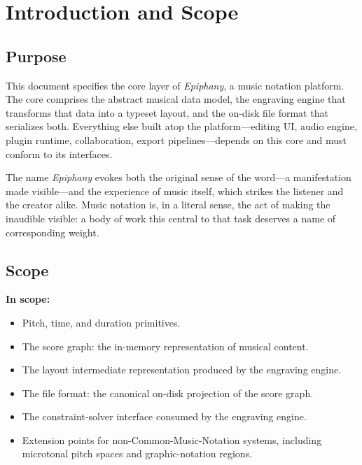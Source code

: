 \documentclass[11pt,letterpaper]{report}
\begin{document}
\clearpage
{}

\chapter{Introduction and Scope}
\label{ch:intro}

\section{Purpose}

This document specifies the core layer of \textit{Epiphany}, a music
notation platform. The core comprises the abstract musical data
model, the engraving engine that transforms that data into a typeset
layout, and the on-disk file format that serializes both. Everything
else built atop the platform---editing UI, audio engine, plugin
runtime, collaboration, export pipelines---depends on this core and
must conform to its interfaces.

The name \textit{Epiphany} evokes both the original sense of the
word---a manifestation made visible---and the experience of music
itself, which strikes the listener and the creator alike. Music
notation is, in a literal sense, the act of making the inaudible
visible: a body of work this central to that task deserves a name
of corresponding weight.

\section{Scope}

\textbf{In scope:}

\begin{itemize}
  \item Pitch, time, and duration primitives.
  \item The score graph: the in-memory representation of musical content.
  \item The layout intermediate representation produced by the engraving
    engine.
  \item The file format: the canonical on-disk projection of the score
    graph.
  \item The constraint-solver interface consumed by the engraving engine.
  \item Extension points for non-Common-Music-Notation systems, including
    microtonal pitch spaces and graphic-notation regions.
\end{itemize}
\end{document}
